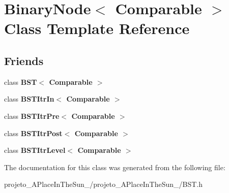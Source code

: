 \hypertarget{class_binary_node}{}\section{Binary\+Node$<$ Comparable $>$ Class Template Reference}
\label{class_binary_node}
\subsection*{Friends}
\begin{DoxyCompactItemize}
\item 
\hypertarget{class_binary_node_a28a1adb9906f3ff7e12c2cb6fa2bd54e}{}\label{class_binary_node_a28a1adb9906f3ff7e12c2cb6fa2bd54e} 
class {\bfseries B\+S\+T$<$ Comparable $>$}
\item 
\hypertarget{class_binary_node_aab3993acac2ab24a0b59edb0c3acc775}{}\label{class_binary_node_aab3993acac2ab24a0b59edb0c3acc775} 
class {\bfseries B\+S\+T\+Itr\+In$<$ Comparable $>$}
\item 
\hypertarget{class_binary_node_a45a55df6f11541416d4ea7684c575c1a}{}\label{class_binary_node_a45a55df6f11541416d4ea7684c575c1a} 
class {\bfseries B\+S\+T\+Itr\+Pre$<$ Comparable $>$}
\item 
\hypertarget{class_binary_node_a5dc153694be266f6e772659486219da7}{}\label{class_binary_node_a5dc153694be266f6e772659486219da7} 
class {\bfseries B\+S\+T\+Itr\+Post$<$ Comparable $>$}
\item 
\hypertarget{class_binary_node_a26ff00bc0d87069aed877f10fd3c80a8}{}\label{class_binary_node_a26ff00bc0d87069aed877f10fd3c80a8} 
class {\bfseries B\+S\+T\+Itr\+Level$<$ Comparable $>$}
\end{DoxyCompactItemize}


The documentation for this class was generated from the following file\+:\begin{DoxyCompactItemize}
\item 
projeto\+\_\+\+A\+Place\+In\+The\+Sun\+\_/projeto\+\_\+\+A\+Place\+In\+The\+Sun\+\_/B\+S\+T.\+h\end{DoxyCompactItemize}
